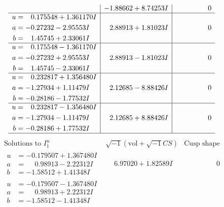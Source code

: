 \documentclass[1p]{elsarticle_modified}
\theoremstyle{definition}
\newcommand{\I}{\sqrt{-1}}
\begin{document}
$$\begin{array}{c|c|c}
 & -1.88662 + 8.74253 I & \phantom{-0.000000 } 0 \\ \hline\begin{aligned}
u &= \phantom{-}0.175548 + 1.361170 I \\
a &= -0.27232 - 2.95553 I \\
b &= \phantom{-}1.45745 + 2.33061 I\end{aligned}
 & \phantom{-}2.88913 + 1.81023 I & \phantom{-0.000000 } 0 \\ \hline\begin{aligned}
u &= \phantom{-}0.175548 - 1.361170 I \\
a &= -0.27232 + 2.95553 I \\
b &= \phantom{-}1.45745 - 2.33061 I\end{aligned}
 & \phantom{-}2.88913 - 1.81023 I & \phantom{-0.000000 } 0 \\ \hline\begin{aligned}
u &= \phantom{-}0.232817 + 1.356480 I \\
a &= -1.27934 + 1.11479 I \\
b &= -0.28186 - 1.77532 I\end{aligned}
 & \phantom{-}2.12685 - 8.88426 I & \phantom{-0.000000 } 0 \\ \hline\begin{aligned}
u &= \phantom{-}0.232817 - 1.356480 I \\
a &= -1.27934 - 1.11479 I \\
b &= -0.28186 + 1.77532 I\end{aligned}
 & \phantom{-}2.12685 + 8.88426 I & \phantom{-0.000000 } 0\\
 \hline 
 \end{array}$$\newpage$$\begin{array}{c|c|c}  
\text{Solutions to }I^u_{1}& \I (\text{vol} + \sqrt{-1}CS) & \text{Cusp shape}\\
 \hline 
\begin{aligned}
u &= -0.179507 + 1.367480 I \\
a &= \phantom{-}0.98913 - 2.22312 I \\
b &= -1.58512 + 1.41348 I\end{aligned}
 & \phantom{-}6.97020 + 1.82589 I & \phantom{-0.000000 } 0 \\ \hline\begin{aligned}
u &= -0.179507 - 1.367480 I \\
a &= \phantom{-}0.98913 + 2.22312 I \\
b &= -1.58512 - 1.41348 I\end{aligned}

\end{array}$$
\end{document}
